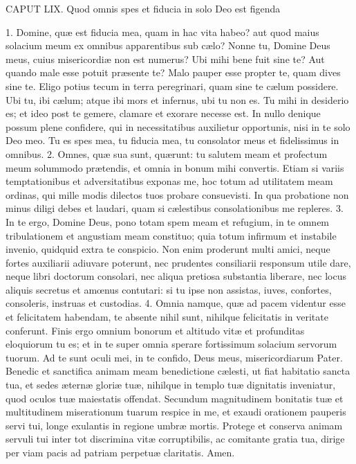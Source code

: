 \documentclass[twoside]{article}
\begin{document}
CAPUT LIX.
Quod omnis spes et fiducia in solo Deo est figenda

1. Domine, quæ est fiducia mea, quam in hac vita habeo? aut quod maius solacium meum ex omnibus apparentibus sub cælo? Nonne tu, Domine Deus meus, cuius misericordiæ non est numerus? Ubi mihi bene fuit sine te? Aut quando male esse potuit præsente te? Malo pauper esse propter te, quam dives sine te. Eligo potius tecum in terra peregrinari, quam sine te cælum possidere. Ubi tu, ibi cælum; atque ibi mors et infernus, ubi tu non es. Tu mihi in desiderio es; et ideo post te gemere, clamare et exorare necesse est. In nullo denique possum plene confidere, qui in necessitatibus auxilietur opportunis, nisi in te solo Deo meo. Tu es spes mea, tu fiducia mea, tu consolator meus et fidelissimus in omnibus.
2. Omnes, quæ sua sunt, quærunt: tu salutem meam et profectum meum solummodo prætendis, et omnia in bonum mihi convertis. Etiam si variis temptationibus et adversitatibus exponas me, hoc totum ad utilitatem meam ordinas, qui mille modis dilectos tuos probare consuevisti. In qua probatione non minus diligi debes et laudari, quam si cælestibus consolationibus me repleres.
3. In te ergo, Domine Deus, pono totam spem meam et refugium, in te omnem tribulationem et angustiam meam constituo; quia totum infirmum et instabile invenio, quidquid extra te conspicio. Non enim proderunt multi amici, neque fortes auxiliarii adiuvare poterunt, nec prudentes consiliarii responsum utile dare, neque libri doctorum consolari, nec aliqua pretiosa substantia liberare, nec locus aliquis secretus et amœnus contutari: si tu ipse non assistas, iuves, confortes, consoleris, instruas et custodias.
4. Omnia namque, quæ ad pacem videntur esse et felicitatem habendam, te absente nihil sunt, nihilque felicitatis in veritate conferunt. Finis ergo omnium bonorum et altitudo vitæ et profunditas eloquiorum tu es; et in te super omnia sperare fortissimum solacium servorum tuorum. Ad te sunt oculi mei, in te confido, Deus meus, misericordiarum Pater. Benedic et sanctifica animam meam benedictione cælesti, ut fiat habitatio sancta tua, et sedes æternæ gloriæ tuæ, nihilque in templo tuæ dignitatis inveniatur, quod oculos tuæ maiestatis offendat. Secundum magnitudinem bonitatis tuæ et multitudinem miserationum tuarum respice in me, et exaudi orationem pauperis servi tui, longe exulantis in regione umbræ mortis. Protege et conserva animam servuli tui inter tot discrimina vitæ corruptibilis, ac comitante gratia tua, dirige per viam pacis ad patriam perpetuæ claritatis. Amen.
\end{document}

